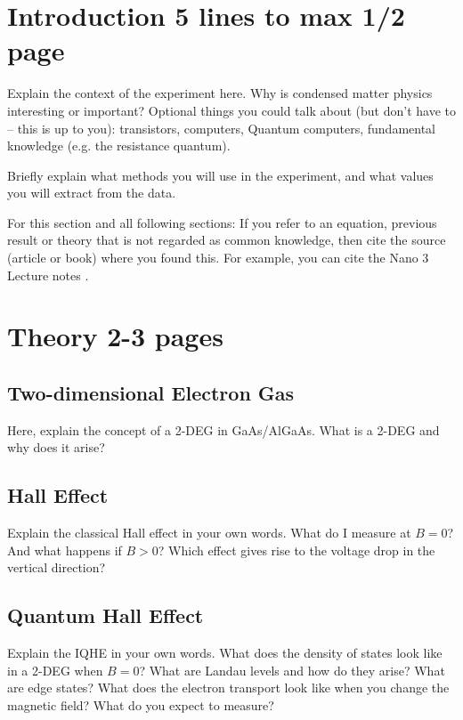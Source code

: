 \documentclass[a4paper]{article}
\begin{document}


\section{Introduction 5 lines to max 1/2 page}
\label{sec:introduction}

Explain the context of the experiment here. Why is condensed matter physics interesting or important?
Optional things you could talk about (but don't have to -- this is up to you): transistors, computers, Quantum computers, fundamental knowledge (e.g. the resistance quantum).

Briefly explain what methods you will use in the experiment, and what values you will extract from the data.

For this section and all following sections: If you refer to an equation, previous result or theory that is not regarded as common knowledge, then cite the source (article or book) where you found this. For example, you can cite the Nano 3 Lecture notes \cite{nano3}.

\section{Theory 2-3 pages}
\label{sec:theory}

\subsection{Two-dimensional Electron Gas}
Here, explain the concept of a 2-DEG in GaAs/AlGaAs. What is a 2-DEG and why does it arise?

\subsection{Hall Effect}
Explain the classical Hall effect in your own words. What do I measure at $B=0$? And what happens if $B>0$? Which effect gives rise to the voltage drop in the vertical direction?

\subsection{Quantum Hall Effect}
Explain the IQHE in your own words. What does the density of states look like in a 2-DEG when $B=0$? What are Landau levels and how do they arise? What are edge states? What does the electron transport look like when you change the magnetic field? What do you expect to measure?
\end{document}

